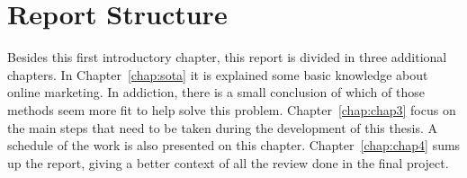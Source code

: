 \section{Report Structure} \label{sec:struct}

Besides this first introductory chapter, this report is divided in three additional chapters.
In Chapter~\ref{chap:sota} it is explained some basic knowledge about online marketing. In addiction, there is
a small conclusion of which of those methods seem more fit to help solve this problem.
Chapter~\ref{chap:chap3} focus on the main steps that need to be taken during the development of this thesis. A schedule of the work is also
presented on this chapter.
Chapter~\ref{chap:chap4} sums up the report, giving a better context of all the review done in the final project.

